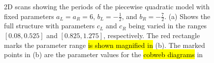 \begin{figure}
	\centering
	\caption[2D scans showing periods of the skewed piecewise quadratic model]{
		2D scans showing the periods of the piecewise quadratic model with fixed parameters $a_L = a_R = 6$, $b_L = -\frac{1}{2}$, and $b_R = -\frac{7}{2}$.
		(a) Shows the full structure with parameters $c_L$ and $c_R$ being varied in the ranges $[0.08, 0.525]$ and $[0.825, 1.275]$, respectively.
		The red rectangle marks the parameter range \hl{is shown magnified in} (b).
		The marked points in (b) are the parameter values for the \hl{cobweb diagrams} in 
	}
	\label{fig:setup.quad.skew.period}
\end{figure}

